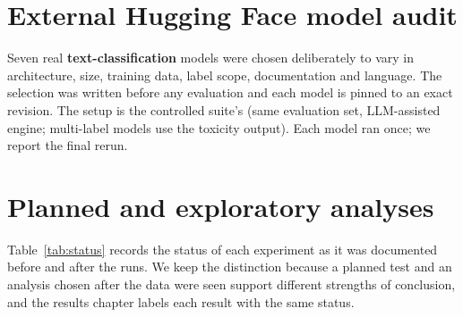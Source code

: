 \section{External Hugging Face model audit}\label{sec:extm}
Seven real \textbf{text-classification} models were chosen deliberately to vary in architecture, size, training data, label scope, documentation and language. The selection was written before any evaluation and each model is pinned to an exact revision. The setup is the controlled suite's (same evaluation set, LLM-assisted engine; multi-label models use the toxicity output). Each model ran once; we report the final rerun.

\section{Planned and exploratory analyses}\label{sec:status}
Table~\ref{tab:status} records the status of each experiment as it was documented before and after the runs. We keep the distinction because a planned test and an analysis chosen after the data were seen support different strengths of conclusion, and the results chapter labels each result with the same status.

